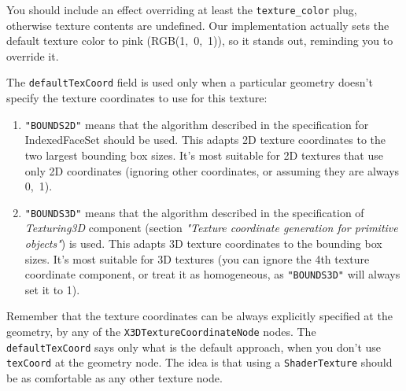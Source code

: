 \documentclass{acmsiggraph}                     %
\begin{document}
You should include an effect overriding at least the \texttt{texture\_color}
plug, otherwise texture contents are undefined. Our implementation actually
sets the default texture color to pink (RGB(1,~0,~1)), so it stands out,
reminding you to override it.

The \texttt{defaultTexCoord} field is used only when a particular geometry
doesn't specify the texture coordinates to use for this texture:

\begin{enumerate}

\item
  \texttt{"BOUNDS2D"} means that the algorithm described in the specification
  for {IndexedFaceSet} should be used. This adapts 2D texture coordinates
  to the two largest bounding box sizes.
  It's most suitable for 2D textures that use only 2D coordinates
  (ignoring other coordinates, or assuming they are always 0,~1).

\item
  \texttt{"BOUNDS3D"} means that the algorithm described in the specification
  of \textit{Texturing3D} component (section \textit{"Texture coordinate generation for primitive objects"})
  is used.
  This adapts 3D texture coordinates to the bounding box sizes.
  It's most suitable for 3D textures (you can ignore the 4th texture coordinate
  component, or treat it as homogeneous, as \texttt{"BOUNDS3D"} will always
  set it to 1).

\end{enumerate}

Remember that the texture coordinates can be always explicitly specified
at the geometry, by any of the \texttt{X3DTextureCoordinateNode} nodes.
The \texttt{defaultTexCoord} says only what is the default approach,
when you don't use \texttt{texCoord} at the geometry node.
The idea is that using a \texttt{ShaderTexture} should be as comfortable
as any other texture node.

\end{document}
